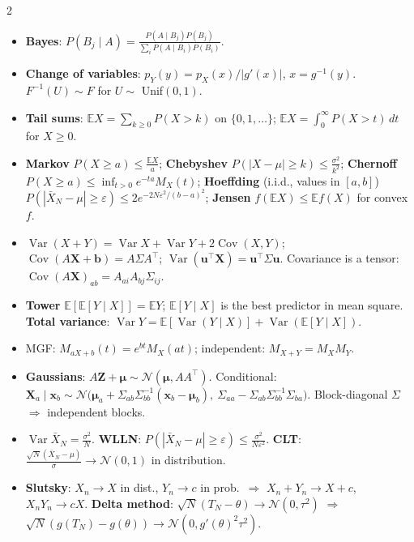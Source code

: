 \documentclass[10pt]{article}
\newcommand{\E}{\mathbb{E}}
\DeclareMathOperator{\Var}{Var}
\DeclareMathOperator{\Cov}{Cov}
\newcommand{\topic}[1]{\par\smallskip\noindent{\color{blue!50!black}\textbf{#1}}\par\nopagebreak}
\begin{document}
\begin{multicols}{2}
\topic{Probability}
\begin{itemize}
    \item \textbf{Bayes}: $P(B_j \mid A) = \frac{P(A \mid B_j)P(B_j)}{\sum_iP(A \mid B_i)P(B_i)}$.
    \item \textbf{Change of variables}: $p_Y(y) = p_X(x)/|g'(x)|$, $x = g^{-1}(y)$. $F^{-1}(U) \sim F$ for $U \sim$ Unif$(0, 1)$.
    \item \textbf{Tail sums}: $\E X = \sum_{k \geq 0}P(X > k)$ on $\{0, 1, \ldots\}$; $\E X = \int_0^\infty P(X > t)\,dt$ for $X \geq 0$.
    \item \textbf{Markov} $P(X \geq a) \leq \frac{\E X}{a}$; \textbf{Chebyshev} $P(|X - \mu| \geq k) \leq \frac{\sigma^2}{k^2}$; \textbf{Chernoff} $P(X \geq a) \leq \inf_{t > 0}e^{-ta}M_X(t)$; \textbf{Hoeffding} (i.i.d., values in $[a, b]$) $P(|\bar X_N - \mu| \geq \varepsilon) \leq 2e^{-2N\varepsilon^2/(b - a)^2}$; \textbf{Jensen} $f(\E X) \leq \E f(X)$ for convex $f$.
    \item $\Var(X + Y) = \Var X + \Var Y + 2\Cov(X, Y)$; $\Cov(A\mathbf{X} + \mathbf{b}) = A\Sigma A^\top$; $\Var(\mathbf{u}^\top\mathbf{X}) = \mathbf{u}^\top\Sigma\mathbf{u}$. Covariance is a tensor: $\Cov(A\mathbf{X})_{ab} = A_{ai}A_{bj}\Sigma_{ij}$.
    \item \textbf{Tower} $\E[\E[Y \mid X]] = \E Y$; $\E[Y \mid X]$ is the best predictor in mean square. \textbf{Total variance}: $\Var Y = \E[\Var(Y \mid X)] + \Var(\E[Y \mid X])$.
    \item MGF: $M_{aX + b}(t) = e^{bt}M_X(at)$; independent: $M_{X+Y} = M_XM_Y$.
    \item \textbf{Gaussians}: $A\mathbf{Z} + \boldsymbol\mu \sim \mathcal{N}(\boldsymbol\mu, AA^\top)$. Conditional: $\mathbf{X}_a \mid \mathbf{x}_b \sim \mathcal{N}\big(\boldsymbol\mu_a + \Sigma_{ab}\Sigma_{bb}^{-1}(\mathbf{x}_b - \boldsymbol\mu_b), \ \Sigma_{aa} - \Sigma_{ab}\Sigma_{bb}^{-1}\Sigma_{ba}\big)$. Block-diagonal $\Sigma$ $\Rightarrow$ independent blocks.
    \item $\Var\bar X_N = \frac{\sigma^2}{N}$. \textbf{WLLN}: $P(|\bar X_N - \mu| \geq \varepsilon) \leq \frac{\sigma^2}{N\varepsilon^2}$. \textbf{CLT}: $\frac{\sqrt N(\bar X_N - \mu)}{\sigma} \to \mathcal{N}(0, 1)$ in distribution.
    \item \textbf{Slutsky}: $X_n \to X$ in dist., $Y_n \to c$ in prob.\ $\Rightarrow$ $X_n + Y_n \to X + c$, $X_nY_n \to cX$. \textbf{Delta method}: $\sqrt N(T_N - \theta) \to \mathcal{N}(0, \tau^2)$ $\Rightarrow$ $\sqrt N(g(T_N) - g(\theta)) \to \mathcal{N}(0, g'(\theta)^2\tau^2)$.

\end{itemize}
\end{multicols}
\end{document}
